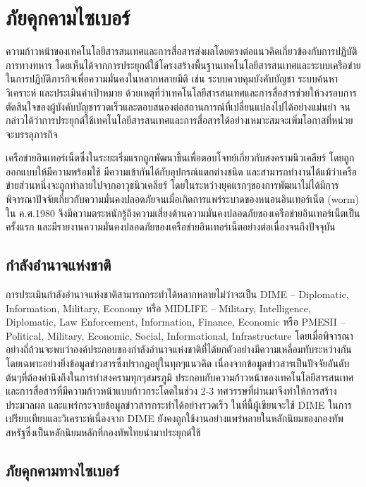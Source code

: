 \documentclass[../th_cyber_warfare_distilled.tex]{subfiles}
\begin{document}
\chapter{ภัยคุกคามไซเบอร์}

ความก้าวหน้าของเทคโนโลยีสารสนเทศและการสื่อสารส่งผลโดยตรงต่อแนวคิดเกี่ยวข้องกับการปฏิบัติการทางทหาร โดยเห็นได้จากการประยุกต์ใช้โครงสร้างพื้นฐานเทคโนโลยีสารสนเทศและระบบเครือข่ายในการปฏิบัติภารกิจเพื่อความมั่นคงในหลากหลายมิติ เช่น ระบบควบคุมบังคับบัญชา ระบบค้นหา วิเคราะห์ และประเมินค่าเป้าหมาย ด้วยเหตุที่ว่าเทคโนโลยีสารสนเทศและการสื่อสารช่วยให้วงรอบการตัดสินใจของผู้บังคับบัญชารวดเร็วและตอบสนองต่อสถานการณ์ที่เปลี่ยนแปลงไปได้อย่างแม่นยำ จนกล่าวได้ว่าการประยุกต์ใช้เทคโนโลยีสารสนเทศและการสื่อสารได้อย่างเหมาะสมจะเพิ่มโอกาสที่หน่วยจะบรรลุภารกิจ 

เครือข่ายอินเทอร์เน็ตซึ่งในระยะเริ่มแรกถูกพัฒนาขึ้นเพื่อตอบโจทย์เกี่ยวกับสงครามนิวเคลียร์ โดยถูกออกแบบให้มีความพร้อมใช้ มีความเข้ากันได้กับอุปกรณ์แตกต่างชนิด และสามารถทำงานได้แม้ว่าเครือข่ายส่วนหนึ่งจะถูกทำลายไปจากอาวุธนิวเคลียร์ โดยในระหว่างยุคแรกๆของการพัฒนาไม่ได้มีการพิจารณาปัจจัยเกี่ยวกับความมั่นคงปลอดภัยจนเมื่อเกิดการแพร่ระบาดของหนอนอินเทอร์เน็ต (worm) ใน ค.ศ.1980 จึงมีความตระหนักรู้ถึงความเสี่ยงด้านความมั่นคงปลอดภัยของเครือข่ายอินเทอร์เน็ตเป็นครั้งแรก และมีรายงานความมั่นคงปลอดภัยของเครือข่ายอินเทอร์เน็ตอย่างต่อเนื่องจนถึงปัจจุบัน

\section{กำลังอำนาจแห่งชาติ}
การประเมินกำลังอำนาจแห่งชาติสามารถกระทำได้หลากหลายไม่ว่าจะเป็น DIME -- Diplomatic, Information, Military, Economy หรือ MIDLIFE -- Military, Intelligence, Diplomatic, Law Enforcement, Information, Finance, Economic หรือ PMESII -- Political, Military, Economic, Social, Informational, Infrastructure โดยเมื่อพิจารณาอย่างถี่ถ้วนจะพบว่าองค์ประกอบของกำลังอำนาจแห่งชาติที่ได้ยกตัวอย่างมีความเหลื่อมทับระหว่างกันโดยเฉพาะอย่างยิ่งข้อมูลข่าวสารซึ่งปรากฎอยู่ในทุกๆแนวคิด เนื่องจากข้อมูลข่าวสารเป็นปัจจัยอันดับต้นๆที่ต้องคำนึงถึงในการทำสงครามทุกๆสมรภูมิ ประกอบกับความก้าวหน้าของเทคโนโลยีสารสนเทศและการสื่อสารที่มีความก้าวหน้าแบบก้าวกระโดดในช่วง 2-3 ทศวรรษที่ผ่านมาจึงทำให้การสร้าง ประมวลผล และแพร่กระจายข้อมูลข่าวสารกระทำได้อย่างรวดเร็ว ในที่นี้ผู้เขียนจะใช้ DIME ในการเปรียบเทียบและวิเคราะห์เนื่องจาก DIME ยังคงถูกใช้งานอย่างแพร่หลายในหลักนิยมของกองทัพสหรัฐซึ่งเป็นหลักนิยมหลักที่กองทัพไทยนำมาประยุกต์ใช้

\section{ภัยคุกคามทางไซเบอร์}
\end{document}
